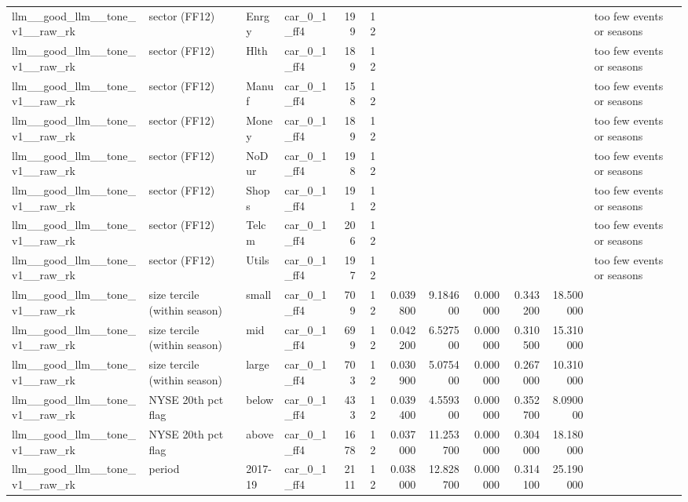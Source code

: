 \begin{table}
\begin{tabular}{llllrrrrrrrl}
llm\_\_good\_llm\_\_tone\_v1\_\_raw\_rk & sector (FF12) & Enrgy & car\_0\_1\_ff4 & 199 & 12 &  &  &  &  &  & too few events or seasons \\
llm\_\_good\_llm\_\_tone\_v1\_\_raw\_rk & sector (FF12) & Hlth & car\_0\_1\_ff4 & 189 & 12 &  &  &  &  &  & too few events or seasons \\
llm\_\_good\_llm\_\_tone\_v1\_\_raw\_rk & sector (FF12) & Manuf & car\_0\_1\_ff4 & 158 & 12 &  &  &  &  &  & too few events or seasons \\
llm\_\_good\_llm\_\_tone\_v1\_\_raw\_rk & sector (FF12) & Money & car\_0\_1\_ff4 & 189 & 12 &  &  &  &  &  & too few events or seasons \\
llm\_\_good\_llm\_\_tone\_v1\_\_raw\_rk & sector (FF12) & NoDur & car\_0\_1\_ff4 & 198 & 12 &  &  &  &  &  & too few events or seasons \\
llm\_\_good\_llm\_\_tone\_v1\_\_raw\_rk & sector (FF12) & Shops & car\_0\_1\_ff4 & 191 & 12 &  &  &  &  &  & too few events or seasons \\
llm\_\_good\_llm\_\_tone\_v1\_\_raw\_rk & sector (FF12) & Telcm & car\_0\_1\_ff4 & 206 & 12 &  &  &  &  &  & too few events or seasons \\
llm\_\_good\_llm\_\_tone\_v1\_\_raw\_rk & sector (FF12) & Utils & car\_0\_1\_ff4 & 197 & 12 &  &  &  &  &  & too few events or seasons \\
llm\_\_good\_llm\_\_tone\_v1\_\_raw\_rk & size tercile (within season) & small & car\_0\_1\_ff4 & 709 & 12 & 0.039800 & 9.184600 & 0.000000 & 0.343200 & 18.500000 &  \\
llm\_\_good\_llm\_\_tone\_v1\_\_raw\_rk & size tercile (within season) & mid & car\_0\_1\_ff4 & 699 & 12 & 0.042200 & 6.527500 & 0.000000 & 0.310500 & 15.310000 &  \\
llm\_\_good\_llm\_\_tone\_v1\_\_raw\_rk & size tercile (within season) & large & car\_0\_1\_ff4 & 703 & 12 & 0.030900 & 5.075400 & 0.000000 & 0.267000 & 10.310000 &  \\
llm\_\_good\_llm\_\_tone\_v1\_\_raw\_rk & NYSE 20th pct flag & below & car\_0\_1\_ff4 & 433 & 12 & 0.039400 & 4.559300 & 0.000000 & 0.352700 & 8.090000 &  \\
llm\_\_good\_llm\_\_tone\_v1\_\_raw\_rk & NYSE 20th pct flag & above & car\_0\_1\_ff4 & 1678 & 12 & 0.037000 & 11.253700 & 0.000000 & 0.304000 & 18.180000 &  \\
llm\_\_good\_llm\_\_tone\_v1\_\_raw\_rk & period & 2017-19 & car\_0\_1\_ff4 & 2111 & 12 & 0.038000 & 12.828700 & 0.000000 & 0.314100 & 25.190000 &  \\

\end{tabular}
\end{table}
